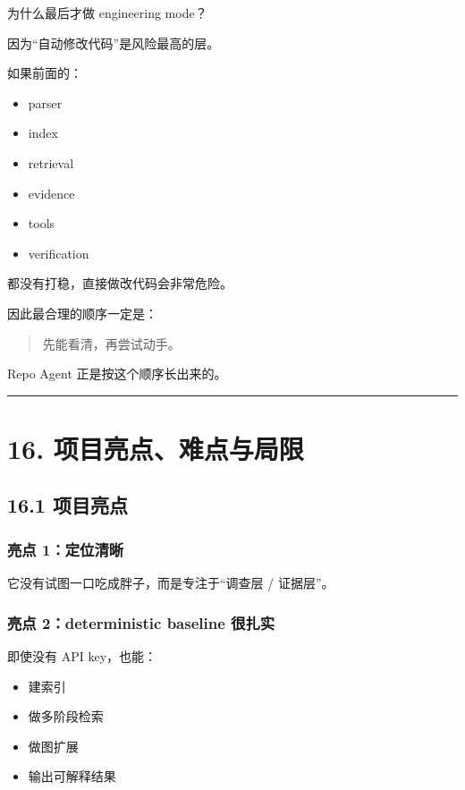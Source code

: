 \documentclass[UTF8,12pt,openany]{ctexbook}
\begin{document}
为什么最后才做 engineering mode？\par

因为“自动修改代码”是风险最高的层。  \par
如果前面的：\par

\begin{itemize}
\item parser
\item index
\item retrieval
\item evidence
\item tools
\item verification
\end{itemize}

都没有打稳，直接做改代码会非常危险。\par

因此最合理的顺序一定是：\par

\begin{quote}
先能看清，再尝试动手。
\end{quote}

Repo Agent 正是按这个顺序长出来的。\par

\hrule

\section{16. 项目亮点、难点与局限}

\subsection{16.1 项目亮点}

\subsubsection{亮点 1：定位清晰}

它没有试图一口吃成胖子，而是专注于“调查层 / 证据层”。\par

\subsubsection{亮点 2：deterministic baseline 很扎实}

即使没有 API key，也能：\par

\begin{itemize}
\item 建索引
\item 做多阶段检索
\item 做图扩展
\item 输出可解释结果
\end{itemize}
\end{document}
